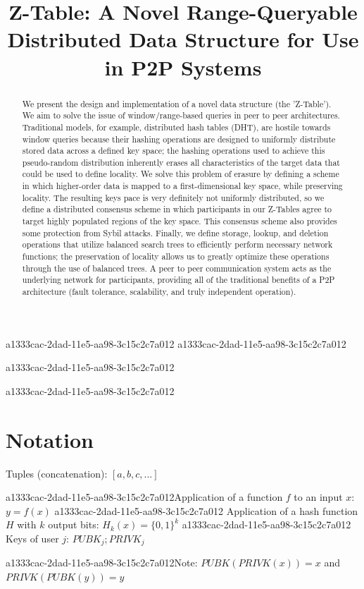 \documentclass[12pt]{article}
\title{Z-Table: A Novel Range-Queryable Distributed Data Structure for Use in P2P Systems}
\begin{document}
a1333cac-2dad-11e5-aa98-3c15c2c7a012
a1333cac-2dad-11e5-aa98-3c15c2c7a012\maketitle

a1333cac-2dad-11e5-aa98-3c15c2c7a012\begin{abstract}
We present the design and implementation of a novel data structure (the 'Z-Table'). We aim to solve the issue of window/range-based queries in peer to peer architectures. Traditional models, for example,  distributed hash tables (DHT), are hostile towards window queries because their hashing operations are designed to uniformly distribute stored data across a defined key space; the hashing operations used to achieve this pseudo-random distribution inherently erases all characteristics of the target data that could be used to define locality. We solve this problem of erasure by defining a scheme in which higher-order data is mapped to a first-dimensional key space, while preserving locality. The resulting keys pace is very definitely not uniformly distributed, so we define a distributed consensus scheme in which participants in our Z-Tables agree to target highly populated regions of the key space. This consensus scheme also provides some protection from Sybil attacks. Finally, we define storage, lookup, and deletion operations that utilize balanced search trees to efficiently perform necessary network functions; the preservation of locality allows us to greatly optimize these operations through the use of balanced trees. A peer to peer communication system acts as the underlying network for participants, providing all of the traditional benefits of a P2P architecture (fault tolerance, scalability, and truly independent operation).
\end{abstract}

a1333cac-2dad-11e5-aa98-3c15c2c7a012\section{Notation}

Tuples (concatenation): $[a,b,c,...]$

a1333cac-2dad-11e5-aa98-3c15c2c7a012Application of a function $f$ to an input $x$: $y=f(x)$
a1333cac-2dad-11e5-aa98-3c15c2c7a012
Application of a hash function $H$ with $k$ output bits: $H_{k}(x) = \{0,1\}^k$
a1333cac-2dad-11e5-aa98-3c15c2c7a012
Keys of user $j$: $ PUBK_j; PRIVK_j $

a1333cac-2dad-11e5-aa98-3c15c2c7a012Note: $PUBK(PRIVK(x)) = x$ and $PRIVK(PUBK(y)) = y$~
\end{document}
